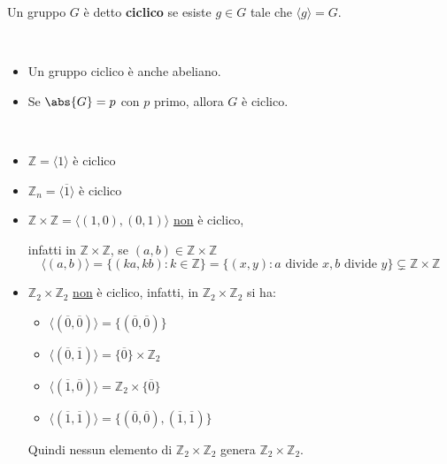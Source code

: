 \documentclass[../main.tex]{subfiles}
\begin{document}
\begin{definition}
    Un gruppo $G$ è detto \textbf{ciclico} se esiste $g \in G$ tale che $\langle g \rangle = G$.
    \begin{note}\
        \begin{itemize}
            \item Un gruppo ciclico è anche abeliano.
            \item Se $\abs{G} = p$ con $p$ primo, allora $G$ è ciclico.
        \end{itemize}
    \end{note}
\end{definition}
\begin{example}
    \
    \begin{itemize}
        \item $\mathbb{Z} = \langle 1 \rangle$ è ciclico
        \item $\mathbb{Z}_n = \langle \overline{1} \rangle$ è ciclico
        \item $\mathbb{Z} \times \mathbb{Z} = \langle (1,0), (0,1) \rangle$ \underline{non} è ciclico,

              infatti in $\mathbb{Z} \times \mathbb{Z} $, se $(a,b) \in \mathbb{Z} \times \mathbb{Z} $
              \[
                  \langle (a,b) \rangle = \{(ka,kb) : k \in \mathbb{Z} \} = \{(x,y) : a \text{ divide } x,b \text{ divide } y\} \subsetneq \mathbb{Z} \times \mathbb{Z}
              \]
        \item $\mathbb{Z}_2 \times \mathbb{Z}_2$ \underline{non} è ciclico, infatti, in $\mathbb{Z}_2 \times \mathbb{Z}_2$ si ha:
              \begin{itemize}
                  \item $\langle (\overline{0},\overline{0}) \rangle = \{(\overline{0},\overline{0})\}$
                  \item $\langle (\overline{0}, \overline{1}) \rangle = \{\overline{0}\} \times \mathbb{Z}_2$
                  \item  $\langle (\overline{1}, \overline{0}) \rangle = \mathbb{Z}_2 \times \{\overline{0}\}$
                  \item $\langle (\overline{1}, \overline{1}) \rangle = \{(\overline{0},\overline{0}),(\overline{1},\overline{1})\}$
              \end{itemize}
              Quindi nessun elemento di $\mathbb{Z}_2 \times \mathbb{Z}_2$ genera $\mathbb{Z}_2 \times \mathbb{Z}_2$.
    \end{itemize}
\end{example}
\end{document}
